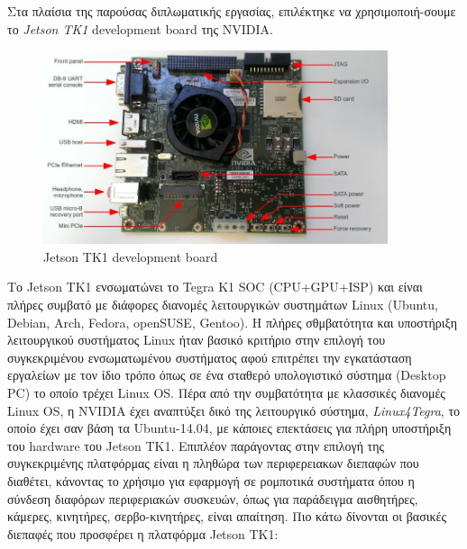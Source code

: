Στα πλαίσια της παρούσας διπλωματικής εργασίας, επιλέκτηκε να χρησιμοποιή-σουμε το
\emph{Jetson TK1} development board της NVIDIA.
\begin{figure}[!ht]
  \centering
  \includegraphics[width=0.9\textwidth]{./images/chapter5/jetson-tk1-labelled.jpg}
  \caption[Jetson TK1 development board]{Jetson TK1 development board}
\end{figure}
Το Jetson TK1 ενσωματώνει το Tegra K1 SOC (CPU+GPU+ISP)
και είναι πλήρες συμβατό με διάφορες διανομές λειτουργικών συστημάτων Linux (Ubuntu, Debian, Arch, Fedora, openSUSE, Gentoo).
Η πλήρες σθμβατότητα και υποστήριξη λειτουργικού συστήματος Linux ήταν βασικό κριτήριο
στην επιλογή του συγκεκριμένου ενσωματωμένου συστήματος αφού επιτρέπει την
εγκατάσταση εργαλείων με τον ίδιο τρόπο όπως σε ένα σταθερό υπολογιστικό σύστημα (Desktop PC)
το οποίο τρέχει Linux OS. Πέρα από την συμβατότητα με κλασσικές διανομές Linux OS,
η NVIDIA έχει αναπτύξει δικό της λειτουργικό σύστημα, \emph{Linux4Tegra}, το οποίο
έχει σαν βάση τα Ubuntu-14.04, με κάποιες επεκτάσεις για πλήρη υποστήριξη του hardware του Jetson TK1.
Επιπλέον παράγοντας στην επιλογή της συγκεκριμένης πλατφόρμας είναι η πληθώρα των περιφερειακων διεπαφών που
διαθέτει, κάνοντας το χρήσιμο για εφαρμογή σε ρομποτικά συστήματα όπου η σύνδεση διαφόρων περιφεριακών συσκευών,
όπως για παράδειγμα αισθητήρες, κάμερες, κινητήρες, σερβο-κινητήρες, είναι απαίτηση.
Πιο κάτω δίνονται οι βασικές διεπαφές που προσφέρει η πλατφόρμα Jetson TK1:
